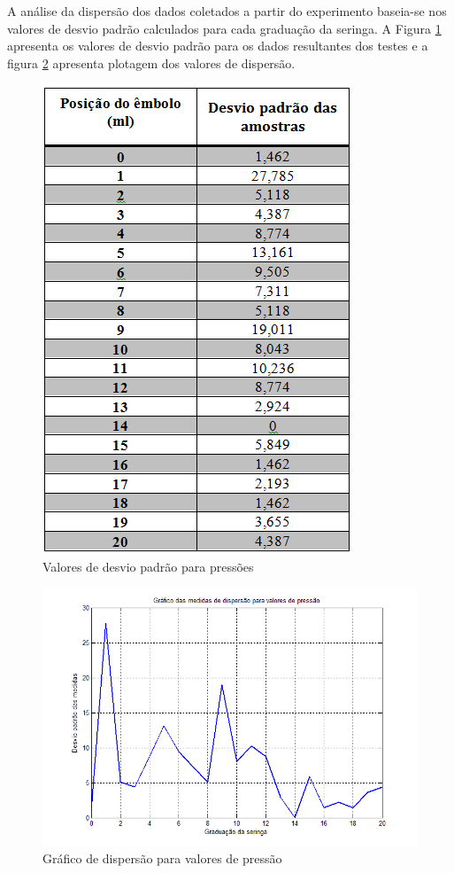 A análise da dispersão dos dados coletados a partir do experimento baseia-se nos valores de desvio padrão calculados para cada graduação da seringa. A Figura \ref{desviopressao} apresenta os valores de desvio padrão para os dados resultantes dos testes e a figura \ref{graficodesvio} apresenta plotagem dos valores de dispersão.

\begin{figure}[H]
		\centering
			\includegraphics[scale=1.0]{figuras/desviopressao.png}
		\caption{Valores de desvio padrão para pressões}
		\label{desviopressao}
\end{figure}

\begin{figure}[H]
		\centering
			\includegraphics[scale=0.8]{figuras/graficodesvio.png}
		\caption{Gráfico de dispersão para valores de pressão}
		\label{graficodesvio}
\end{figure}

